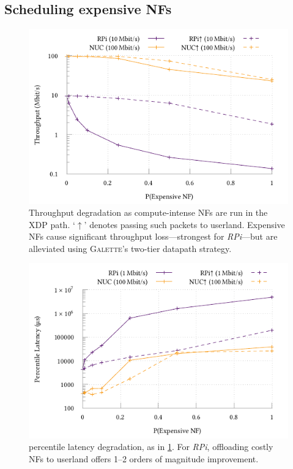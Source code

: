 \documentclass[comsoc, conference, times]{IEEEtran}
\newcommand{\ourtech}{\textsc{Galette}}
\begin{document}
\subsection{Scheduling expensive NFs}
\begin{figure}
	\centering
	\includegraphics[keepaspectratio,width=\resultplotwidth]{../plots/build/blocking-xdp/tput-degrade-10-new}
	\caption{Throughput degradation as compute-intense NFs are run in the XDP path. `$\uparrow$' denotes passing such packets to userland. Expensive NFs cause significant throughput loss---strongest for \emph{RPi}---but are alleviated using \ourtech{}'s two-tier datapath strategy.\label{fig:tput-degrade}}
\end{figure}

\begin{figure}
	\centering
	\includegraphics[keepaspectratio,width=\resultplotwidth]{../plots/build/blocking-xdp/lat-degrade-99-new}
	\caption{ percentile latency degradation, as in \cref{fig:tput-degrade}. For \emph{RPi}, offloading costly NFs to userland offers \numrange{1}{2} orders of magnitude improvement.\label{fig:lat-degrade}}
\end{figure}
\end{document}
